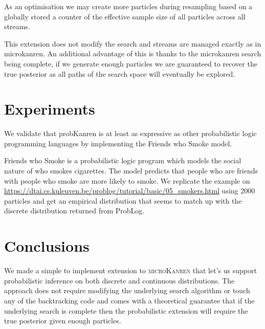 \documentclass[
]{ceurart}
\begin{document}
As an optimisation we may create more particles during resampling
based on a globally stored a counter of the effective sample size of
all particles across all streams.

This extension does not modify the search and streams are managed
exactly as in microkanren. An additional advantage of this is thanks
to the microkanren search being complete, if we generate enough
particles we are guaranteed to recover the true posterior as all paths
of the search space will eventually be explored.

\section{Experiments}

We validate that probKanren is at least as expressive as other probabilistic
logic programming languages by implementing the Friends who Smoke model.

Friends who Smoke is a probabilistic logic program which models the
social nature of who smokes cigarettes. The model predicts that people
who are friends with people who smoke are more likely to smoke. We
replicate the example on
\url{https://dtai.cs.kuleuven.be/problog/tutorial/basic/05_smokers.html}
using 2000 particles and get an empirical distribution that seems to
match up with the discrete distribution returned from ProbLog.




\section{Conclusions}

We made a simple to implement extension to \textsc{microKanren} that
let's us support probabilistic inference on both discrete and
continuous distributions. The approach does not require modifying the
underlying search algorithm or touch any of the backtracking code and
comes with a theoretical guarantee that if the underlying search is
complete then the probabilistic extension will require the true
posterior given enough particles.
\end{document}
